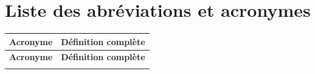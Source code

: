 \documentclass[12pt,a4paper]{report}
\begin{document}
\tableofcontents
\newpage
\listoffigures
\newpage
\listoftables
\newpage

\chapter*{Liste des abréviations et acronymes}

\begin{longtable}{p{3.2cm}p{11.5cm}}
\toprule
\textbf{Acronyme} & \textbf{Définition complète} \\
\midrule
\endfirsthead
\toprule
\textbf{Acronyme} & \textbf{Définition complète} \\
\midrule
\endhead
\bottomrule
\endfoot


\end{longtable}
\end{document}
